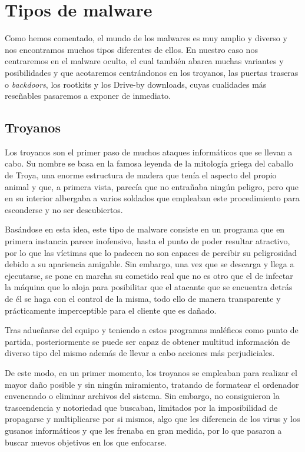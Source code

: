 \section{Tipos de malware}
	Como hemos comentado, el mundo de los malwares es muy amplio y diverso y nos encontramos muchos tipos diferentes de ellos. En nuestro caso nos centraremos en el malware oculto, el cual también abarca muchas variantes y posibilidades y que acotaremos centrándonos en los troyanos, las puertas traseras o \textit{backdoors}, los rootkits y los Drive-by downloads, cuyas cualidades más reseñables pasaremos a exponer de inmediato.

	\subsection{Troyanos}
		Los troyanos son el primer paso de muchos ataques informáticos que se llevan a cabo. Su nombre se basa en la famosa leyenda de la mitología griega del caballo de Troya, una enorme estructura de madera que tenía el aspecto del propio animal y que, a primera vista, parecía que no entrañaba ningún peligro, pero que en su interior albergaba a varios soldados que empleaban este procedimiento para esconderse y no ser descubiertos.

		Basándose en esta idea, este tipo de malware consiste en un programa que en primera instancia parece inofensivo, hasta el punto de poder resultar atractivo, por lo que las víctimas que lo padecen no son capaces de percibir su peligrosidad debido a su apariencia amigable. Sin embargo, una vez que se descarga y llega a ejecutarse, se pone en marcha su cometido real que no es otro que el de infectar la máquina que lo aloja para posibilitar que el atacante que se encuentra detrás de él se haga con el control de la misma, todo ello de manera transparente y prácticamente imperceptible para el cliente que es dañado.

		Tras adueñarse del equipo y teniendo a estos programas maléficos como punto de partida, posteriormente se puede ser capaz de obtener multitud información de diverso tipo del mismo además de llevar a cabo acciones más perjudiciales.

		De este modo, en un primer momento, los troyanos se empleaban para realizar el mayor daño posible y sin ningún miramiento, tratando de formatear el ordenador envenenado o eliminar archivos del sistema. Sin embargo, no consiguieron la trascendencia y notoriedad que buscaban, limitados por la imposibilidad de propagarse y multiplicarse por si mismos, algo que les diferencia de los virus y los gusanos informáticos y que les frenaba en gran medida, por lo que pasaron a buscar nuevos objetivos en los que enfocarse.

